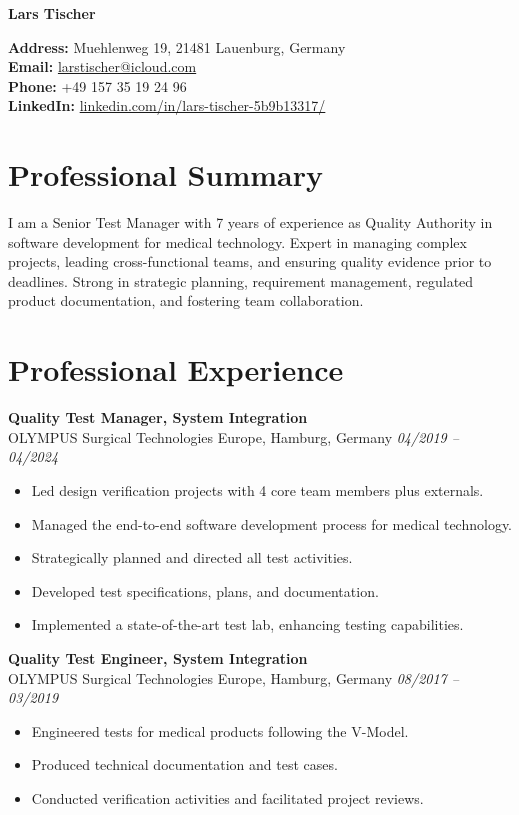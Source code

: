 \documentclass[a4paper,10pt]{article}
\begin{document}
\centerline{\huge \textbf{Lars Tischer}}
\smallskip
\noindent
\textbf{Address:} Muehlenweg 19, 21481 Lauenburg, Germany \\
\textbf{Email:} \href{mailto:larstischer@icloud.com}{larstischer@icloud.com} \\
\textbf{Phone:} +49 157 35 19 24 96 \\
\textbf{LinkedIn:} \href{https://www.linkedin.com/in/lars-tischer-5b9b13317/}{linkedin.com/in/lars-tischer-5b9b13317/}

\section*{Professional Summary}
I am a Senior Test Manager with 7 years of experience as Quality Authority in software development for medical technology. Expert in managing complex projects, leading cross-functional teams, and ensuring quality evidence prior to deadlines. Strong in strategic planning, requirement management, regulated product documentation, and fostering team collaboration.

\section*{Professional Experience}
\textbf{Quality Test Manager, System Integration} \\
OLYMPUS Surgical Technologies Europe, Hamburg, Germany \hfill \textit{04/2019 – 04/2024} 
\begin{itemize}
    \item Led design verification projects with 4 core team members plus externals.
    \item Managed the end-to-end software development process for medical technology.
    \item Strategically planned and directed all test activities.
    \item Developed test specifications, plans, and documentation.
    \item Implemented a state-of-the-art test lab, enhancing testing capabilities.
\end{itemize}

\textbf{Quality Test Engineer, System Integration} \\
OLYMPUS Surgical Technologies Europe, Hamburg, Germany \hfill \textit{08/2017 – 03/2019}
\begin{itemize}
    \item Engineered tests for medical products following the V-Model.
    \item Produced technical documentation and test cases.
    \item Conducted verification activities and facilitated project reviews.
\end{itemize}
\end{document}
